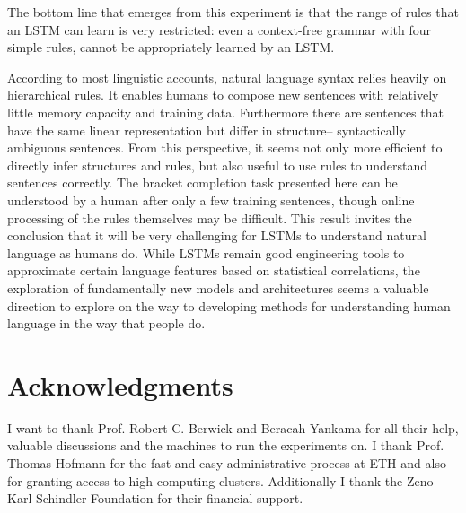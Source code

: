 \documentclass[11pt,a4paper]{article}
\begin{document}

The bottom line that emerges from this experiment is that the range of rules that an LSTM can learn is very restricted: even a context-free grammar with four simple rules, cannot be appropriately learned by an LSTM. 

According to most linguistic accounts, natural language syntax relies heavily on hierarchical rules. It enables humans to compose new sentences with relatively little memory capacity and training data. Furthermore there are sentences that have the same linear representation but differ in structure-- syntactically ambiguous sentences.  From this perspective, it seems not only more efficient to directly infer structures and rules, but also useful to use rules to understand sentences correctly. The bracket completion task presented here can be understood by a human after only a few training sentences, though online processing of the rules themselves may be difficult. This result invites the conclusion that it will be very challenging for LSTMs to understand natural language as humans do. While LSTMs remain good engineering tools to approximate certain language features based on statistical correlations, the exploration of fundamentally new models and architectures seems a valuable direction to explore on the way to developing methods for understanding human language in the way that people do.

\section*{Acknowledgments}
I want to thank Prof. Robert C. Berwick and Beracah Yankama for all their help, valuable discussions and the machines to run the experiments on. I thank Prof. Thomas Hofmann for the fast and easy administrative process at ETH and also for granting access to high-computing clusters. Additionally I thank the Zeno Karl Schindler Foundation for their financial support.



\end{document}
